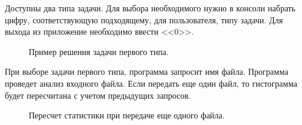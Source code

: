 \documentclass[a4paper,14pt]{extarticle}
\begin{document}
Доступны два типа задачи. Для выбора необходимого нужно в консоли набрать цифру, соответствующую подходящему, для пользователя, типу задачи. Для выхода из приложение необходимо ввести <<0>>.

\begin{figure}[h]
\caption{Пример решения задачи первого типа.}
\label{1.png}
\end{figure}

При выборе задачи первого типа, программа запросит имя файла. Программа проведет анализ входного файла. Если передать еще один файл, то гистограмма будет пересчитана с учетом предыдущих запросов.

\begin{figure}[H]
\caption{Пересчет статистики при передаче еще одного файла.}
\label{1.png}
\end{figure}
\end{document}
